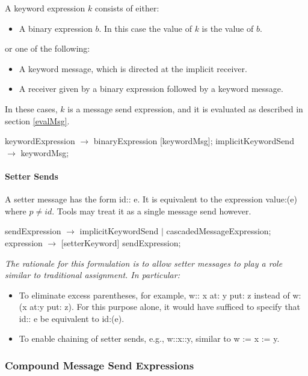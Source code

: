 \documentclass{article}
\newcommand{\code}[1]{{\sf #1}}
\begin{document}
A keyword expression $k$ consists of either:
\begin{itemize}
\item A  binary expression $b$. In this case  the value of $k$ is the value of $b$.
\end{itemize}
or one of the following:
\begin{itemize}
\item A keyword message, which is directed at the implicit receiver.
\item A receiver given by a binary expression followed by a keyword message. 
\end{itemize}
In these cases, $k$ is a message send expression, and it is evaluated as described in section \ref{evalMsg}.
\begin{newspeak}
keywordExpression $\rightarrow$  binaryExpression [keywordMsg];
implicitKeywordSend $\rightarrow$ keywordMsg;
\end{newspeak}


\paragraph{Setter Sends}
\label{setter}

A setter message has the form \code{id:: e}.  It is equivalent to the expression \code{[:p $|$ id:p. p] value:(e)} where $p \ne id$.   Tools may treat it as a single message send however.

\begin{newspeak}
sendExpression $\rightarrow$ implicitKeywordSend $|$ cascadedMessageExpression; 
expression $\rightarrow$ [setterKeyword] sendExpression;
\end{newspeak}

{\it
The rationale for this formulation is to allow setter messages to play a role similar to traditional assignment. In particular:
\begin{itemize}
\item To eliminate excess parentheses, for example, \code{w:: x at: y put: z} instead of \code{w:(x at:y put: z)}. For this purpose alone, it would have sufficed to specify that  \code{id:: e} be equivalent to \code{id:(e)}. 
\item To enable chaining of setter sends, e.g., \code{w::x::y}, similar to \code{w := x := y}.
\end{itemize}
}

\subsubsection{Compound Message Send Expressions}
\end{document}
